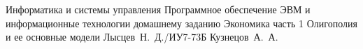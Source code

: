 \documentclass{bmstu}
\begin{document}
\makereporttitle
{Информатика и системы управления} %
{Программное обеспечение ЭВМ и информационные технологии}
{домашнему заданию} %
{Экономика часть 1} %
{Олигополия и ее основные модели} %
{} %
{Лысцев~Н.~Д./ИУ7-73Б} %
{Кузнецов~А.~А.} %
{}

\maketableofcontents




%


\makebibliography
\end{document}
